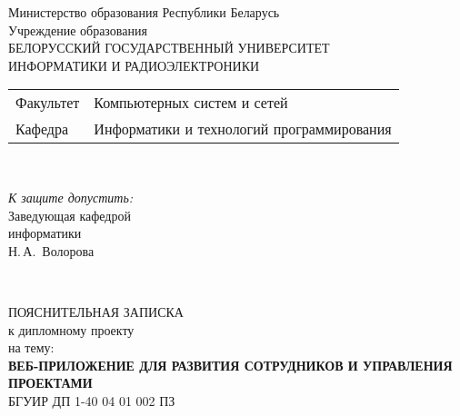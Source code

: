 \begin{titlepage}
  \begin{center}
    Министерство образования Республики Беларусь\\[1em]
    Учреждение образования\\
    БЕЛОРУССКИЙ ГОСУДАРСТВЕННЫЙ УНИВЕРСИТЕТ \\
    ИНФОРМАТИКИ И РАДИОЭЛЕКТРОНИКИ\\[1em]

    \begin{minipage}{\textwidth}
      \begin{flushleft}
        \begin{tabular}{ l l }
          Факультет & Компьютерных систем и сетей\\
          Кафедра   & Информатики и технологий программирования
        \end{tabular}
      \end{flushleft}
    \end{minipage}\\[1em]

    \begin{flushright}
      \begin{minipage}{0.4\textwidth}
        \textit{К защите допустить:}\\[0.8em]
        Заведующая кафедрой\\
        информатики\\[0.45em]
        \underline{\hspace*{2.8cm}} Н.\,А.~Волорова
      \end{minipage}\\[3.2em]
    \end{flushright}

    {ПОЯСНИТЕЛЬНАЯ ЗАПИСКА}\\
    {к дипломному проекту}\\
    {на тему:}\\[1em]
    \textbf{\large \MakeUppercase{Веб-приложение для развития сотрудников и управления проектами}}\\[1em]


    {БГУИР ДП 1-40 04 01 002 ПЗ}\\[2em]
    

\end{center}
\end{titlepage}
